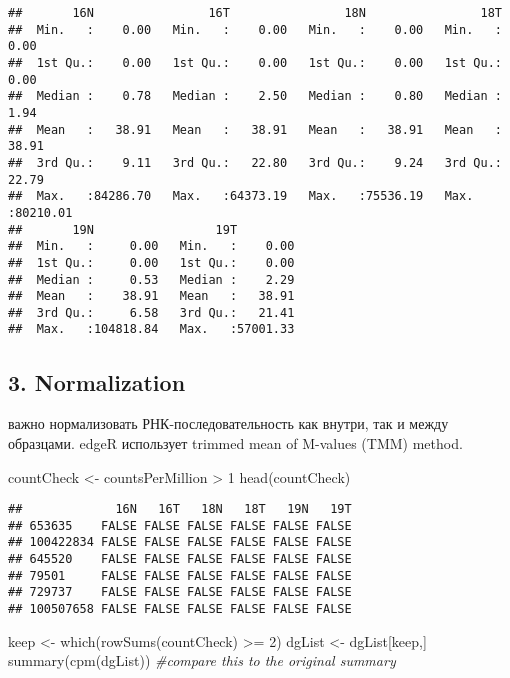 \documentclass[
]{article}
\newenvironment{Shaded}{\begin{snugshade}}{\end{snugshade}}
\newcommand{\CommentTok}[1]{\textcolor[rgb]{0.56,0.35,0.01}{\textit{#1}}}
\newcommand{\DecValTok}[1]{\textcolor[rgb]{0.00,0.00,0.81}{#1}}
\newcommand{\FunctionTok}[1]{\textcolor[rgb]{0.00,0.00,0.00}{#1}}
\newcommand{\NormalTok}[1]{#1}
\newcommand{\OtherTok}[1]{\textcolor[rgb]{0.56,0.35,0.01}{#1}}
\newcommand{\SpecialCharTok}[1]{\textcolor[rgb]{0.00,0.00,0.00}{#1}}
\begin{document}
\begin{verbatim}
##       16N                16T                18N                18T          
##  Min.   :    0.00   Min.   :    0.00   Min.   :    0.00   Min.   :    0.00  
##  1st Qu.:    0.00   1st Qu.:    0.00   1st Qu.:    0.00   1st Qu.:    0.00  
##  Median :    0.78   Median :    2.50   Median :    0.80   Median :    1.94  
##  Mean   :   38.91   Mean   :   38.91   Mean   :   38.91   Mean   :   38.91  
##  3rd Qu.:    9.11   3rd Qu.:   22.80   3rd Qu.:    9.24   3rd Qu.:   22.79  
##  Max.   :84286.70   Max.   :64373.19   Max.   :75536.19   Max.   :80210.01  
##       19N                 19T          
##  Min.   :     0.00   Min.   :    0.00  
##  1st Qu.:     0.00   1st Qu.:    0.00  
##  Median :     0.53   Median :    2.29  
##  Mean   :    38.91   Mean   :   38.91  
##  3rd Qu.:     6.58   3rd Qu.:   21.41  
##  Max.   :104818.84   Max.   :57001.33
\end{verbatim}

\hypertarget{normalization}{%
\subsection{3. Normalization}\label{normalization}}

важно нормализовать РНК-последовательность как внутри, так и между
образцами. edgeR использует trimmed mean of M-values (TMM) method.

\begin{Shaded}
\begin{Highlighting}[]
\NormalTok{countCheck }\OtherTok{\textless{}{-}}\NormalTok{ countsPerMillion }\SpecialCharTok{\textgreater{}} \DecValTok{1}
\FunctionTok{head}\NormalTok{(countCheck)}
\end{Highlighting}
\end{Shaded}

\begin{verbatim}
##             16N   16T   18N   18T   19N   19T
## 653635    FALSE FALSE FALSE FALSE FALSE FALSE
## 100422834 FALSE FALSE FALSE FALSE FALSE FALSE
## 645520    FALSE FALSE FALSE FALSE FALSE FALSE
## 79501     FALSE FALSE FALSE FALSE FALSE FALSE
## 729737    FALSE FALSE FALSE FALSE FALSE FALSE
## 100507658 FALSE FALSE FALSE FALSE FALSE FALSE
\end{verbatim}

\begin{Shaded}
\begin{Highlighting}[]
\NormalTok{keep }\OtherTok{\textless{}{-}} \FunctionTok{which}\NormalTok{(}\FunctionTok{rowSums}\NormalTok{(countCheck) }\SpecialCharTok{\textgreater{}=} \DecValTok{2}\NormalTok{)}
\NormalTok{dgList }\OtherTok{\textless{}{-}}\NormalTok{ dgList[keep,]}
\FunctionTok{summary}\NormalTok{(}\FunctionTok{cpm}\NormalTok{(dgList)) }\CommentTok{\#compare this to the original summary}
\end{Highlighting}
\end{Shaded}
\end{document}
